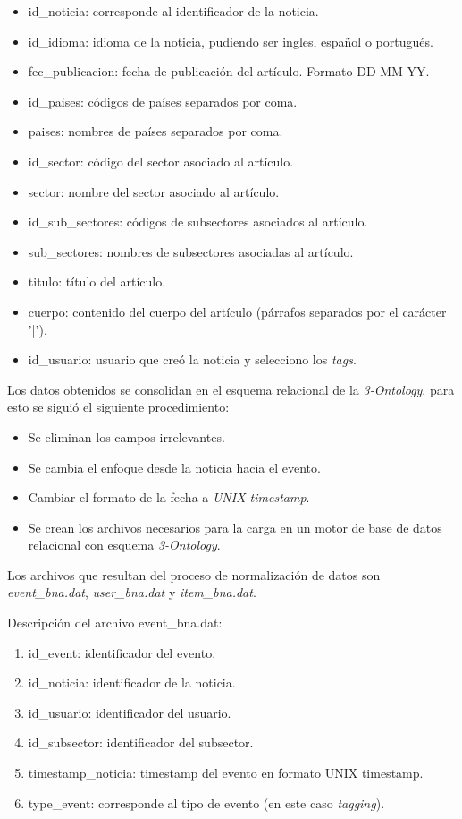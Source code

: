 \begin{itemize}
	\item id\_noticia: corresponde al identificador de la noticia.
	\item id\_idioma: idioma de la noticia, pudiendo ser ingles, español o portugués.
	\item fec\_publicacion: fecha de publicación del artículo. Formato DD-MM-YY.
	\item id\_paises: códigos de países separados por coma.
	\item paises: nombres de países separados por coma.
	\item id\_sector: código del sector asociado al artículo.
	\item sector: nombre del sector asociado al artículo.
	\item id\_sub\_sectores: códigos de subsectores asociados al artículo.
	\item sub\_sectores: nombres de subsectores asociadas al artículo.
	\item titulo: título del artículo.
	\item cuerpo: contenido del cuerpo del artículo (párrafos separados por el carácter '|').
	\item id\_usuario: usuario que creó la noticia y selecciono los \textit{tags}.
\end{itemize}

Los datos obtenidos se consolidan en el esquema relacional de la \textit{3-Ontology}, para esto se siguió el siguiente procedimiento:

\begin{itemize}
	\item Se eliminan los campos irrelevantes.
	\item Se cambia el enfoque desde la noticia hacia el evento.
	\item Cambiar el formato de la fecha a \textit{UNIX timestamp}.
	\item Se crean los archivos necesarios para la carga en un motor de base de datos relacional con esquema \textit{3-Ontology}.
\end{itemize}

Los archivos que resultan del proceso de normalización de datos son \textit{event\_bna.dat}, \textit{user\_bna.dat} y \textit{item\_bna.dat}.

Descripción del archivo event\_bna.dat:
\begin{enumerate}
	\item id\_event: identificador del evento.
	\item id\_noticia: identificador de la noticia.
	\item id\_usuario: identificador del usuario.
	\item id\_subsector: identificador del subsector.
	\item timestamp\_noticia: timestamp del evento en formato UNIX timestamp.
	\item type\_event: corresponde al tipo de evento (en este caso \textit{tagging}).
\end{enumerate}

